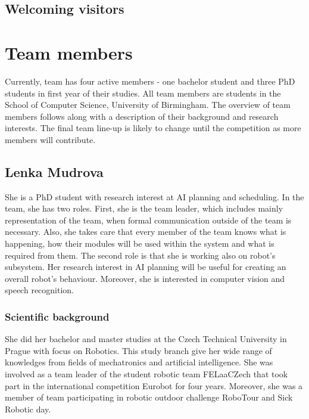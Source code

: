 \documentclass[conference]{IEEEtran}
\begin{document}
\subsection{Welcoming visitors}




\section{Team members}

Currently, team has four active members - one bachelor student and three PhD students in first year of their studies. All team members are students in the School of Computer Science, University of Birmingham. The overview of team members follows along with a description of their background and research interests. The final team line-up is likely to change until the competition as more members will contribute.

\subsection{Lenka Mudrova}

She is a PhD student with research interest at AI planning and scheduling. In the team, she has two roles. First, she is the team leader, which includes mainly representation of the team, when formal communication outside of the team is necessary. Also, she takes care that every member of the team knows what is happening, how their modules will be used within the system and what is required from them. The second role is that she is working also on robot's subsystem. Her research interest in AI planning will be useful for creating an overall robot's behaviour. Moreover, she is interested in computer vision and speech recognition. 

\subsubsection*{Scientific background}
She did her bachelor and master studies at the Czech Technical University in Prague with focus on Robotics. This study branch give her wide range of knowledges from fields of mechatronics and artificial intelligence. She was involved as a team leader of the student robotic team FELaaCZech that took part in the international competition Eurobot for four years. Moreover, she was a member of team participating in robotic outdoor challenge RoboTour and Sick Robotic day. 
\end{document}
